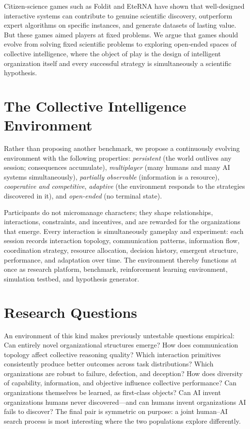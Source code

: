 \documentclass{article}
\begin{document}
Citizen-science games such as Foldit and EteRNA have shown that well-designed interactive systems can contribute to genuine scientific discovery, outperform expert algorithms on specific instances, and generate datasets of lasting value. But these games aimed players at fixed problems. We argue that games should evolve from solving fixed scientific problems to exploring open-ended spaces of collective intelligence, where the object of play is the design of intelligent organization itself and every successful strategy is simultaneously a scientific hypothesis.

\section{The Collective Intelligence Environment}

Rather than proposing another benchmark, we propose a continuously evolving environment with the following properties: \emph{persistent} (the world outlives any session; consequences accumulate), \emph{multiplayer} (many humans and many AI systems simultaneously), \emph{partially observable} (information is a resource), \emph{cooperative and competitive}, \emph{adaptive} (the environment responds to the strategies discovered in it), and \emph{open-ended} (no terminal state).

Participants do not micromanage characters; they shape relationships, interactions, constraints, and incentives, and are rewarded for the organizations that emerge. Every interaction is simultaneously gameplay and experiment: each session records interaction topology, communication patterns, information flow, coordination strategy, resource allocation, decision history, emergent structure, performance, and adaptation over time. The environment thereby functions at once as research platform, benchmark, reinforcement learning environment, simulation testbed, and hypothesis generator.

\section{Research Questions}

An environment of this kind makes previously untestable questions empirical: Can entirely novel organizational structures emerge? How does communication topology affect collective reasoning quality? Which interaction primitives consistently produce better outcomes across task distributions? Which organizations are robust to failure, defection, and deception? How does diversity of capability, information, and objective influence collective performance? Can organizations themselves be learned, as first-class objects? Can AI invent organizations humans never discovered---and can humans invent organizations AI fails to discover? The final pair is symmetric on purpose: a joint human--AI search process is most interesting where the two populations explore differently.
\end{document}
